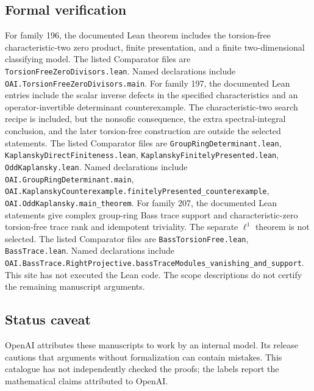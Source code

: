 \documentclass[11pt]{article}
\begin{document}
\subsection{Formal verification}
For family 196, the documented Lean theorem includes the torsion-free characteristic-two zero product, finite presentation, and a finite two-dimensional classifying model. The listed Comparator files are \texttt{TorsionFreeZeroDivisors.lean}. Named declarations include \texttt{OAI.TorsionFreeZeroDivisors.main}. For family 197, the documented Lean entries include the scalar inverse defects in the specified characteristics and an operator-invertible determinant counterexample. The characteristic-two search recipe is included, but the nonsofic consequence, the extra spectral-integral conclusion, and the later torsion-free construction are outside the selected statements. The listed Comparator files are \texttt{GroupRingDeterminant.lean}, \texttt{KaplanskyDirectFiniteness.lean}, \texttt{KaplanskyFinitelyPresented.lean}, \texttt{OddKaplansky.lean}. Named declarations include \texttt{OAI.GroupRingDeterminant.main}, \texttt{OAI.KaplanskyCounterexample.finitelyPresented\_counterexample}, \texttt{OAI.OddKaplansky.main\_theorem}. For family 207, the documented Lean statements give complex group-ring Bass trace support and characteristic-zero torsion-free trace rank and idempotent triviality. The separate $\ell^1$ theorem is not selected. The listed Comparator files are \texttt{BassTorsionFree.lean}, \texttt{BassTrace.lean}. Named declarations include \texttt{OAI.BassTrace.RightProjective.bassTraceModules\_vanishing\_and\_support}. This site has not executed the Lean code. The scope descriptions do not certify the remaining manuscript arguments.

\subsection{Status caveat}
OpenAI attributes these manuscripts to work by an internal model. Its release cautions that arguments without formalization can contain mistakes. This catalogue has not independently checked the proofs; the labels report the mathematical claims attributed to OpenAI.
\end{document}

